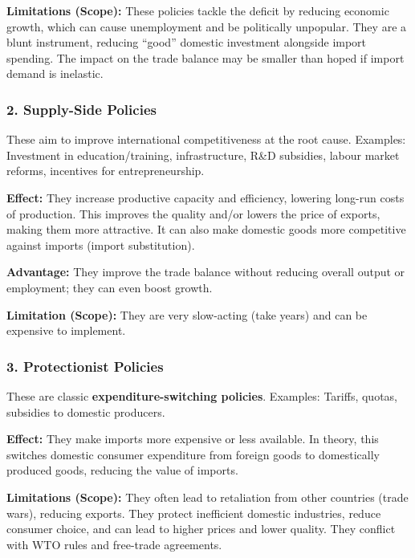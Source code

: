 \documentclass[11pt, a4paper, twoside]{book}
\begin{document}
\textbf{Limitations (Scope):} These policies tackle the deficit by reducing economic growth, which can cause unemployment and be politically unpopular. They are a blunt instrument, reducing ``good'' domestic investment alongside import spending. The impact on the trade balance may be smaller than hoped if import demand is inelastic.

\subsubsection{2. Supply-Side Policies}

These aim to improve international competitiveness at the root cause. Examples: Investment in education/training, infrastructure, R\&D subsidies, labour market reforms, incentives for entrepreneurship.

\textbf{Effect:} They increase productive capacity and efficiency, lowering long-run costs of production. This improves the quality and/or lowers the price of exports, making them more attractive. It can also make domestic goods more competitive against imports (import substitution).

\textbf{Advantage:} They improve the trade balance without reducing overall output or employment; they can even boost growth.

\textbf{Limitation (Scope):} They are very slow-acting (take years) and can be expensive to implement.

\subsubsection{3. Protectionist Policies}

These are classic \textbf{expenditure-switching policies}. Examples: Tariffs, quotas, subsidies to domestic producers.

\textbf{Effect:} They make imports more expensive or less available. In theory, this switches domestic consumer expenditure from foreign goods to domestically produced goods, reducing the value of imports.

\textbf{Limitations (Scope):} They often lead to retaliation from other countries (trade wars), reducing exports. They protect inefficient domestic industries, reduce consumer choice, and can lead to higher prices and lower quality. They conflict with WTO rules and free-trade agreements.
\end{document}
